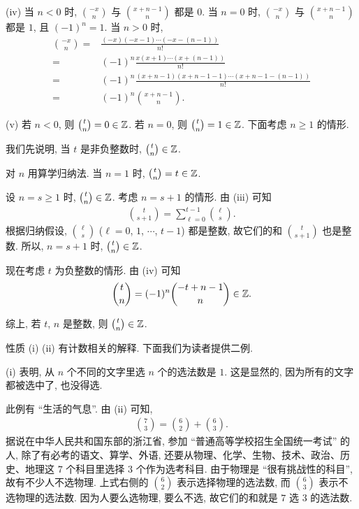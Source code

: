 \begin{pf}
    (iv) 当 $n<0$ 时, $\binom{-x}{n}$ 与 $\binom{x + n - 1}{n}$ 都是 $0$. 当 $n=0$ 时, $\binom{-x}{n}$ 与 $\binom{x + n - 1}{n}$ 都是 $1$, 且 $(-1)^n = 1$. 当 $n>0$ 时,
    \begin{align*}
        \binom{-x}{n}
        = {} & \frac{(-x)(-x-1) \cdots (-x-(n-1))}{n!}                 \\
        = {} & (-1)^n \frac{x(x+1) \cdots (x+(n-1))}{n!}               \\
        = {} & (-1)^n \frac{(x+n-1)(x+n-1-1) \cdots (x+n-1-(n-1))}{n!} \\
        = {} & (-1)^n \binom{x+n-1}{n}.
    \end{align*}

    (v) 若 $n < 0$, 则 $\binom{t}{n} = 0 \in \mathbb{Z}$. 若 $n = 0$, 则 $\binom{t}{n} = 1 \in \mathbb{Z}$. 下面考虑 $n \geq 1$ 的情形.

    我们先说明, 当 $t$ 是非负整数时, $\binom{t}{n} \in \mathbb{Z}$.

    对 $n$ 用算学归纳法. 当 $n = 1$ 时, $\binom{t}{n} = t \in \mathbb{Z}$.

    设 $n = s \geq 1$ 时, $\binom{t}{n} \in \mathbb{Z}$. 考虑 $n = s + 1$ 的情形. 由 (iii) 可知
    \begin{align*}
        \binom{t}{s + 1} = \sum_{\ell = 0}^{t - 1} \binom{\ell}{s}.
    \end{align*}
    根据归纳假设, $\binom{\ell}{s}$ ($\ell = 0$, $1$, $\cdots$, $t-1$) 都是整数, 故它们的和 $\binom{t}{s + 1}$ 也是整数. 所以, $n = s + 1$ 时, $\binom{t}{n} \in \mathbb{Z}$.

    现在考虑 $t$ 为负整数的情形. 由 (iv) 可知
    \begin{align*}
        \binom{t}{n} = (-1)^n \binom{-t + n - 1}{n} \in \mathbb{Z}.
    \end{align*}

    综上, 若 $t$, $n$ 是整数, 则 $\binom{t}{n} \in \mathbb{Z}$.
\end{pf}

性质 (i) (ii) 有计数相关的解释. 下面我们为读者提供二例.

\begin{example}
    (i) 表明, 从 $n$ 个不同的文字里选 $n$ 个的选法数是 $1$. 这是显然的, 因为所有的文字都被选中了, 也没得选.
\end{example}

\begin{example}
    此例有 ``生活的气息''. 由 (ii) 可知,
    \begin{align*}
        \binom{7}{3} = \binom{6}{2} + \binom{6}{3}.
    \end{align*}
    据说在中华人民共和国东部的浙江省, 参加 ``普通高等学校招生全国统一考试''  的人, 除了有必考的语文、算学、外语, 还要从物理、化学、生物、技术、政治、历史、地理这 $7$ 个科目里选择 $3$ 个作为选考科目. 由于物理是 ``很有挑战性的科目'', 故有不少人不选物理. 上式右侧的 $\binom{6}{2}$ 表示选择物理的选法数, 而 $\binom{6}{3}$ 表示不选物理的选法数. 因为人要么选物理, 要么不选, 故它们的和就是 $7$ 选 $3$ 的选法数.
\end{example}

